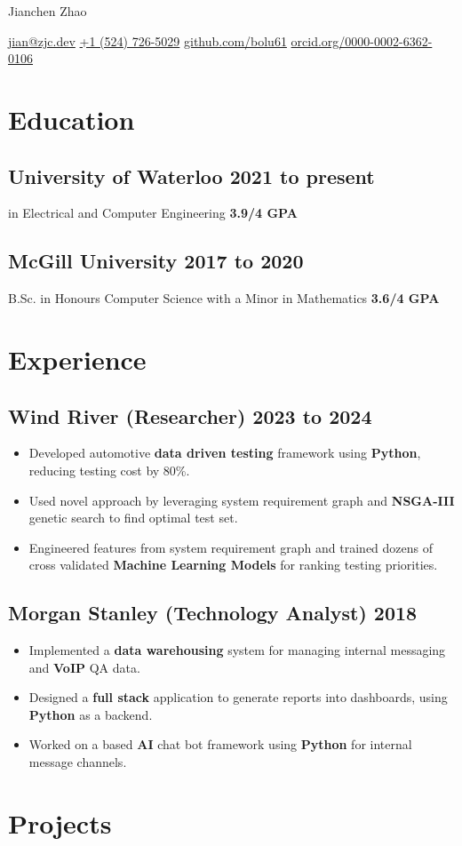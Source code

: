 \documentclass[10pt,letterpaper]{article}
\newcommand{\datedsubsection}[2]{\subsection[#1]{#1 \hfill #2}}
\newcommand{\name}[1]{\centerline{\Huge{#1}}}
\newcommand{\contact}[1]{\centerline{#1}}
\newcommand{\sep}{{\large\textperiodcentered}}
\renewcommand{\emph}[1]{{\color{emphcolor}\bfseries#1}}
\begin{document}
\name{Jianchen Zhao}
\contact{\href{mailto:jian@zjc.dev}{jian@zjc.dev} \sep{} \href{tel:+15147265029}{+1 (524) 726-5029} \sep{} \href{https://github.com/bolu61}{github.com/bolu61} \sep{} \href{https://orcid.org/0000-0002-6362-0106}{orcid.org/0000-0002-6362-0106}}

\section{Education}

\datedsubsection{\emph{University of Waterloo}}{2021 to present}
\noindent \emph{Ph.D.} in Electrical and Computer Engineering \emph{3.9/4 GPA}

\datedsubsection{\emph{McGill University}}{2017 to 2020}
\noindent B.Sc. in Honours Computer Science with a Minor in Mathematics \emph{3.6/4 GPA}

\section{Experience}

\datedsubsection{Wind River (Researcher)}{2023 to 2024}
\begin{itemize}
    \item Developed automotive \emph{data driven testing} framework using \emph{Python}, reducing testing cost by 80\%.
    \item Used novel approach by leveraging system requirement graph and
    \emph{NSGA-III} genetic search to find optimal test set.
    \item Engineered features from system requirement graph and trained dozens of cross validated
    \emph{Machine Learning Models} for ranking testing priorities.
\end{itemize}

\datedsubsection{Morgan Stanley (Technology Analyst)}{2018}
\begin{itemize}
    \item Implemented a \emph{data warehousing} system for managing internal messaging and \emph{VoIP} QA data. 
    \item Designed a \emph{full stack} application to generate reports into
    dashboards, using \emph{Python} as a backend.
    \item Worked on a based \emph{AI} chat bot framework using \emph{Python} for
    internal message channels.
\end{itemize}

\section{Projects}
\end{document}

